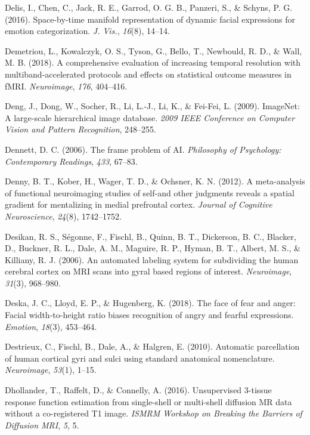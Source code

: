 \documentclass[12pt,american,a4paper,oneside,]{memoir} %
\begin{document}
\leavevmode\hypertarget{ref-Delis2016-zl}{}%
Delis, I., Chen, C., Jack, R. E., Garrod, O. G. B., Panzeri, S., \& Schyns, P. G. (2016). Space-by-time manifold representation of dynamic facial expressions for emotion categorization. \emph{J. Vis.}, \emph{16}(8), 14--14.

\leavevmode\hypertarget{ref-Demetriou2018-xp}{}%
Demetriou, L., Kowalczyk, O. S., Tyson, G., Bello, T., Newbould, R. D., \& Wall, M. B. (2018). A comprehensive evaluation of increasing temporal resolution with multiband-accelerated protocols and effects on statistical outcome measures in fMRI. \emph{Neuroimage}, \emph{176}, 404--416.

\leavevmode\hypertarget{ref-Deng2009-bp}{}%
Deng, J., Dong, W., Socher, R., Li, L.-J., Li, K., \& Fei-Fei, L. (2009). ImageNet: A large-scale hierarchical image database. \emph{2009 IEEE Conference on Computer Vision and Pattern Recognition}, 248--255.

\leavevmode\hypertarget{ref-Dennett2006-el}{}%
Dennett, D. C. (2006). The frame problem of AI. \emph{Philosophy of Psychology: Contemporary Readings}, \emph{433}, 67--83.

\leavevmode\hypertarget{ref-denny2012meta}{}%
Denny, B. T., Kober, H., Wager, T. D., \& Ochsner, K. N. (2012). A meta-analysis of functional neuroimaging studies of self-and other judgments reveals a spatial gradient for mentalizing in medial prefrontal cortex. \emph{Journal of Cognitive Neuroscience}, \emph{24}(8), 1742--1752.

\leavevmode\hypertarget{ref-Desikan2006-gh}{}%
Desikan, R. S., Ségonne, F., Fischl, B., Quinn, B. T., Dickerson, B. C., Blacker, D., Buckner, R. L., Dale, A. M., Maguire, R. P., Hyman, B. T., Albert, M. S., \& Killiany, R. J. (2006). An automated labeling system for subdividing the human cerebral cortex on MRI scans into gyral based regions of interest. \emph{Neuroimage}, \emph{31}(3), 968--980.

\leavevmode\hypertarget{ref-Deska2018-hx}{}%
Deska, J. C., Lloyd, E. P., \& Hugenberg, K. (2018). The face of fear and anger: Facial width-to-height ratio biases recognition of angry and fearful expressions. \emph{Emotion}, \emph{18}(3), 453--464.

\leavevmode\hypertarget{ref-Destrieux2010-rd}{}%
Destrieux, C., Fischl, B., Dale, A., \& Halgren, E. (2010). Automatic parcellation of human cortical gyri and sulci using standard anatomical nomenclature. \emph{Neuroimage}, \emph{53}(1), 1--15.

\leavevmode\hypertarget{ref-Dhollander2016-dx}{}%
Dhollander, T., Raffelt, D., \& Connelly, A. (2016). Unsupervised 3-tissue response function estimation from single-shell or multi-shell diffusion MR data without a co-registered T1 image. \emph{ISMRM Workshop on Breaking the Barriers of Diffusion MRI}, \emph{5}, 5.
\end{document}

